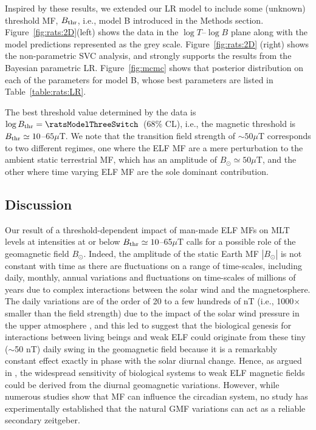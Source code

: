 \documentclass[letter,twoside]{article}
\begin{document}
 
Inspired by these results, we extended our LR model  to include  some (unknown) threshold MF, $B_{\rm thr}$, i.e., model B introduced in the Methods section. Figure~\ref{fig:rats:2D}(left) shows the data in the $\log T$--$\log B$ plane along with the model predictions represented as the grey scale. 
Figure~\ref{fig:rats:2D} (right) shows  the non-parametric SVC analysis, and strongly supports the results from the Bayesian parametric LR.
 Figure~\ref{fig:mcmc} shows that posterior distribution on each of the parameters for model B, whose best parameters are listed in Table~\ref{table:rats:LR}. 
 
 The best threshold value determined by the data is $\log B_{\rm thr}=\ratsModelThreeSwitch$\ratsModelThreeSwitchErr\ (68\% CL), i.e., the magnetic threshold is $B_{\rm thr}\simeq10$--$65\mu$T. %
 We note that the transition field  strength of $\sim50\mu$T   corresponds to
two different regimes, one where the ELF MF are a mere perturbation to the ambient static terrestrial MF, which has
an amplitude of $B_{\odot}\simeq50\mu$T, and the other where time varying ELF MF are the sole dominant contribution.  
 


\subsection*{Discussion}
 \label{section:discussion}
 


Our result of a threshold-dependent impact of man-made ELF MFs on MLT levels at intensities at or below $B_{\rm thr}\simeq10$--65$\mu$T  calls for a possible  role of the geomagnetic field $B_{\odot}$.  Indeed, the amplitude of the static Earth MF $|B_{\odot}|$ is not constant with time as there are fluctuations on a range of time-scales, including daily, monthly, annual variations and fluctuations on time-scales of millions of years \citep[see e.g.][]{CourtillotV_1988} due to complex interactions between the solar wind and the magnetosphere.  The daily variations are of the order of 20 to a few hundreds of  nT (i.e., 1000$\times$ smaller than the field strength)
 due to the impact of the solar wind pressure in the upper atmosphere \citep[e.g.][]{Hitchman1998},   
and this led \citet{Liboff2013}  to suggest that the
biological genesis for interactions between living beings and weak ELF could originate from these tiny ($\sim$50 nT) daily swing in the geomagnetic field    because it is a remarkably constant effect exactly in phase with the solar diurnal change.  Hence, as argued in  \citet{Liboff2013},  the widespread sensitivity of biological systems to weak ELF magnetic fields could be  derived from the diurnal geomagnetic variations.
However, while numerous studies show that MF
can influence the circadian system, no study has experimentally established that the natural GMF variations can act as a reliable secondary zeitgeber.
 
\end{document}
